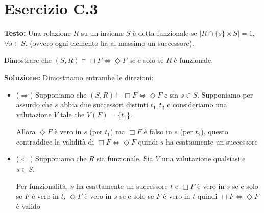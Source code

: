 \documentclass[a4paper,12pt]{article}
\newcommand{\esercizio}[2]{%
    \textbf{Testo:}
    #1
    
    \vspace{1.5em}
    
    \textbf{Soluzione:}
    #2
}
\begin{document}
\section*{Esercizio C.3}
\esercizio{%
    Una relazione $R$ su un insieme $S$ è detta funzionale se
    $|R \cap \{s\} \times S| = 1$, $\forall s \in S$. (ovvero ogni elemento ha al massimo un successore).

    Dimostrare che $(S, R) \models \Box F \Leftrightarrow \Diamond F$ se e solo se $R$ è funzionale.
}{%
    Dimostriamo entrambe le direzioni:
    \begin{itemize}
        \item ($\Rightarrow$) Supponiamo che $(S,R) \models \Box F \Leftrightarrow \Diamond F$ e sia $s \in S$. Supponiamo per assurdo che $s$ abbia due successori distinti $t_1, t_2$ e consideriamo una valutazione $V$ tale che $V(F) = \{t_1\}$.

              Allora $\Diamond F$ è vero in $s$ (per $t_1$) ma $\Box F$ è falso in $s$ (per $t_2$), questo contraddice la validità di $\Box F \Leftrightarrow \Diamond F$ quindi $s$ ha esattamente un successore

        \item ($\Leftarrow$) Supponiamo che $R$ sia funzionale. Sia $V$ una valutazione qualsiasi e $s \in S$.

              Per funzionalità, $s$ ha esattamente un successore $t$ e $\Box F$ è vero in $s$ se e solo se $F$ è vero in $t$,  $\Diamond F$ è vero in $s$ se e solo se $F$ è vero in $t$ quindi $\Box F \Leftrightarrow \Diamond F$ è valido
    \end{itemize}
}
\end{document}
